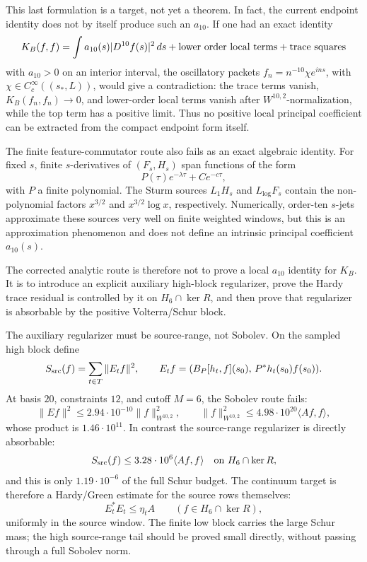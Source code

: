 \documentclass[11pt]{article}
\begin{document}
This last formulation is a target, not yet a theorem.  In fact, the current
endpoint identity does not by itself produce such an \(a_{10}\).  If one had an
exact identity
\[
  K_B(f,f)=\int a_{10}(s)|D^{10}f(s)|^2\,ds
  +\hbox{lower order local terms}+\hbox{trace squares}
\]
with \(a_{10}>0\) on an interior interval, the oscillatory packets
\(f_n=n^{-10}\chi e^{ins}\), with
\(\chi\in C_c^\infty((s_\ast,L))\), would give a contradiction:
the trace terms vanish, \(K_B(f_n,f_n)\to0\), and lower-order local terms
vanish after \(W^{10,2}\)-normalization, while the top term has a positive
limit.  Thus no positive local principal coefficient can be extracted from
the compact endpoint form itself.

The finite feature-commutator route also fails as an exact algebraic identity.
For fixed \(s\), finite \(s\)-derivatives of \((F_s,H_s)\) span functions of
the form
\[
  P(\tau)e^{-\lambda\tau}+C e^{-c\tau},
\]
with \(P\) a finite polynomial.  The Sturm sources \(L_1H_s\) and
\(L_{\log}F_s\) contain the non-polynomial factors \(x^{3/2}\) and
\(x^{3/2}\log x\), respectively.  Numerically, order-ten \(s\)-jets approximate
these sources very well on finite weighted windows, but this is an
approximation phenomenon and does not define an intrinsic principal coefficient
\(a_{10}(s)\).

The corrected analytic route is therefore not to prove a local \(a_{10}\)
identity for \(K_B\).  It is to introduce an explicit auxiliary high-block
regularizer, prove the Hardy trace residual is controlled by it on
\(H_6\cap\ker R\), and then prove that regularizer is absorbable by the
positive Volterra/Schur block.

The auxiliary regularizer must be source-range, not Sobolev.  On the sampled
high block define
\[
  S_{\rm src}(f)=\sum_{t\in T}\|E_t f\|^2,\qquad
  E_t f=(B_P[h_t,f](s_0),\,P^\ast h_t(s_0)f(s_0)).
\]
At basis \(20\), constraints \(12\), and cutoff \(M=6\), the Sobolev route
fails:
\[
  \|E f\|^2\le 2.94\cdot10^{-10}\|f\|_{W^{10,2}}^2,\qquad
  \|f\|_{W^{10,2}}^2\le 4.98\cdot10^{20}\langle Af,f\rangle,
\]
whose product is \(1.46\cdot10^{11}\).  In contrast the source-range
regularizer is directly absorbable:
\[
  S_{\rm src}(f)\le 3.28\cdot10^6\langle Af,f\rangle
  \quad\hbox{on }H_6\cap\ker R,
\]
and this is only \(1.19\cdot10^{-6}\) of the full Schur budget.  The continuum
target is therefore a Hardy/Green estimate for the source rows themselves:
\[
  E_t^\ast E_t\le \eta_t A\qquad (f\in H_6\cap\ker R),
\]
uniformly in the source window.  The finite low block carries the large Schur
mass; the high source-range tail should be proved small directly, without
passing through a full Sobolev norm.
\end{document}

